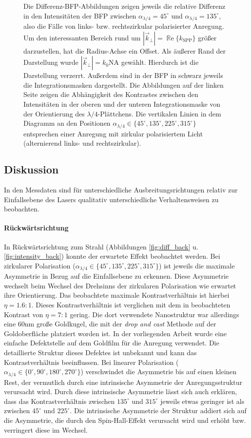 \documentclass[titlepage]{article}
\renewcommand{\Re}{\operatorname{\mathbb{R}e}}
\begin{document}
\begin{figure}
		\caption[PSHE Messung]{Die Differenz-BFP-Abbildungen zeigen jeweils die relative Differenz in den Intensitäten der BFP zwischen $\alpha_{\lambda/4} = 45^\circ$ und  $\alpha_{\lambda/4} = 135^\circ$, also die Fälle von links- bzw. rechtszirkular polarisierter Anregung. Um den interessanten Bereich rund um $|\vec{k}_\perp| = \Re\{k_\mathrm{SPP}\}$ größer darzustellen, hat die Radius-Achse ein Offset. Als äußerer Rand der Darstellung wurde $|\vec{k}_\perp| = k_0\mathrm{NA}$ gewählt. Hierdurch ist die Darstellung verzerrt. Außerdem sind in der BFP in schwarz jeweils die Integrationsmasken dargestellt. Die Abbildungen auf der linken Seite zeigen die Abhängigkeit des Kontrastes zwischen den Intensitäten in der oberen und der unteren Integrationsmaske von der Orientierung des $\lambda/4$-Plättchens. Die vertikalen Linien in dem Diagramm an den Positionen $\alpha_{\lambda/4} \in \{45^\circ, 135^\circ, 225^\circ, 315^\circ\}$ entsprechen einer Anregung mit zirkular polarisiertem Licht (alternierend links- und rechtszirkular).}	
	\end{figure}
	\subsection{Diskussion}
	In den Messdaten sind für unterschiedliche Ausbreitungsrichtungen relativ zur Einfallsebene des Lasers qualitativ unterschiedliche Verhaltensweisen zu beobachten.
	\paragraph{Rückwärtsrichtung}
	In Rückwärtsrichtung zum Strahl (Abbildungen \ref{fig:diff_back} u. \ref{fig:intensity_back}) konnte der erwartete Effekt beobachtet werden. Bei zirkularer Polarisation ($\alpha_{\lambda/4} \in \{45^\circ, 135^\circ, 225^\circ, 315^\circ\}$) ist jeweils die maximale Asymmetrie in Bezug auf die Einfallsebene zu erkennen. Diese Asymmetrie wechselt beim Wechsel des Drehsinns der zirkularen Polarisation wie erwartet ihre Orientierung. Das beobachtete maximale Kontrastverhältnis ist hierbei $\eta = 1.6:1$. Dieses Kontrastverhältnis ist verglichen mit dem in \cite{OConnor.2014} beobachteten Kontrast von $\eta =7:1$ gering.  Die dort verwendete Nanostruktur war allerdings eine  $60\mathrm{nm}$ große Goldkugel, die mit der \textit{drop and cast} Methode auf der Goldoberfläche platziert worden ist. In der vorliegenden Arbeit wurde eine einfache Defektstelle auf dem Goldfilm für die Anregung verwendet. Die detaillierte Struktur dieses Defektes ist unbekannt und kann das Kontrastverhältnis beeinflussen.  Bei linearer Polarisation ($\alpha_{\lambda/4} \in \{0^\circ, 90^\circ, 180^\circ, 270^\circ\}$) verschwindet die Asymmetrie bis auf einen kleinen Rest, der vermutlich durch eine intrinsische Asymmetrie der Anregungsstruktur verursacht wird. Durch diese intrinsische Asymmetrie lässt sich auch erklären, dass das Kontrastverhältnis zwischen $135^\circ$ und $ 315^\circ$ jeweils etwas geringer ist als zwischen $45^\circ$ und $225^\circ$.
	Die intrinsische Asymmetrie der Struktur addiert sich auf die Asymmetrie, die durch den Spin-Hall-Effekt verursacht wird und erhöht bzw. verringert diese im Wechsel.
\end{document}
